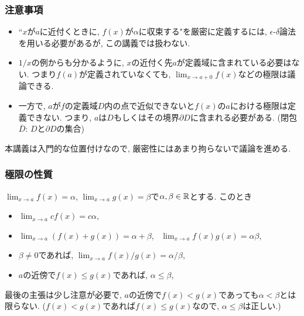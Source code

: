 

\begin{frame}
\frametitle{注意事項} 


\begin{Rem}
\begin{itemize}
\item ``$x$が$a$に近付くときに, $f(x)$が$\alpha$に収束する"を厳密に定義するには, $\epsilon$-$\delta$論法を用いる必要があるが, この講義では扱わない. 
\item $1/x$の例からも分かるように, $x$の近付く先$a$が定義域に含まれている必要はない. 
つまり$f(a)$が定義されていなくても, $\displaystyle \lim_{x \to a+0}f(x)$などの極限は議論できる. 
\item 一方で, $a$が$f$の定義域$D$内の点で近似できないと$f(x)$の$a$における極限は定義できない. 
つまり, $a$は$D$もしくはその境界$\partial D$に含まれる必要がある. (閉包$\overline{D}$: $D$と$\partial D$の集合)
\end{itemize}
\end{Rem}

本講義は入門的な位置付けなので, 厳密性にはあまり拘らないで議論を進める. 

\end{frame}





\begin{frame}
\frametitle{極限の性質} 


\begin{Thm}
$\displaystyle \lim_{x\to a}f(x)=\alpha$, $\displaystyle \lim_{x\to a}g(x)=\beta$で$\alpha,\beta \in \mathbb{R}$とする. 
このとき
\begin{itemize}
\item $\displaystyle \lim_{x\to a} cf(x)=c \alpha$, \vspace{1mm}
\item $\displaystyle \lim_{x\to a}(f(x)+g(x))=\alpha+\beta$, \ $\displaystyle \lim_{x\to a}f(x)g(x)=\alpha\beta$,  \vspace{1mm}
\item $\beta \neq0$であれば, $\displaystyle \lim_{x\to a}f(x)/g(x)=\alpha/\beta$,  \vspace{1mm}
\item $a$の近傍で$f(x)\le g(x)$であれば, $\alpha \le \beta$, 
\end{itemize}
\end{Thm}

最後の主張は少し注意が必要で, $a$の近傍で$f(x)< g(x)$であっても$\alpha < \beta$とは限らない.  
($f(x)< g(x)$であれば$f(x)\le g(x)$なので, $\alpha \le \beta$は正しい.)

\end{frame}


